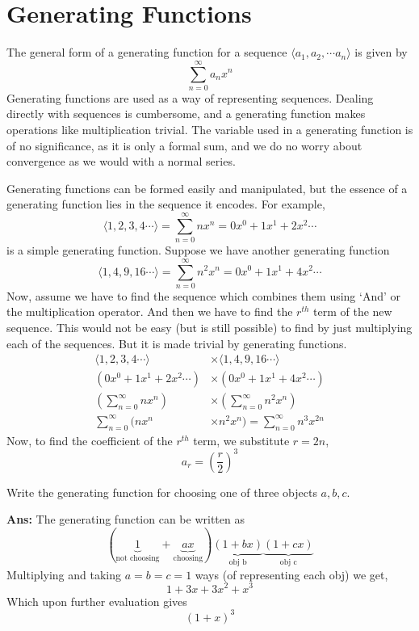 \chapter{Generating Functions}
The general form of a generating function for a sequence \mbox{$\langle a_1, a_2, \cdots a_n\rangle$} is given by
\[
    \sum_{n=0}^{\infty}a_n x^n
\]
Generating functions are used as a way of representing sequences. Dealing directly with sequences is cumbersome, and a generating function makes operations like multiplication trivial. The variable used in a generating function is of no significance, as it is only a formal sum, and we do no worry about convergence as we would with a normal series.

Generating functions can be formed easily and manipulated, but the essence of a generating function lies in the sequence it encodes. For example,
\[
    \langle1,2,3,4\cdots\rangle = \sum_{n=0}^{\infty} nx^n = 0x^0 + 1x^1 + 2x^2 \cdots
\]
is a simple generating function. Suppose we have another generating function
\[
    \langle1,4,9,16 \cdots\rangle =  \sum_{n=0}^{\infty} n^2x^n = 0x^0 + 1x^1 + 4x^2 \cdots
\]
Now, assume we have to find the sequence which combines them using `And' or the multiplication operator. And then we have to find the \mbox{$r^{th}$} term of the new sequence. This would not be easy (but is still possible) to find by just multiplying each of the sequences. But it is made trivial by generating functions.
\begin{align*}
    \langle1,2,3,4\cdots\rangle & \times \langle1,4,9,16 \cdots\rangle  \\
    (0x^0 + 1x^1 + 2x^2 \cdots) & \times (0x^0 + 1x^1 + 4x^2 \cdots)    \\
    (\sum_{n=0}^{\infty} nx^n)  & \times (\sum_{n=0}^{\infty} n^2x^n)\, \\
    \sum_{n=0}^{\infty} (nx^n   & \times n^2 x^n)
    = \sum_{n=0}^{\infty} n^3 x^{2n}
\end{align*}
Now, to find the coefficient of the \mbox{$r^{th}$} term, we substitute \mbox{$r = 2n$},
\[
    a_r = {\left(\frac{r}{2}\right)}^3
\]

\begin{example}
    Write the generating function for choosing one of three objects \mbox{$a,b,c$}.

    \textbf{Ans:} The generating function can be written as
    \[
        (\underbrace{1}_{\text{not choosing}}+\underbrace{ax}_{\text{choosing}})\underbrace{(1+bx)}_{\text{obj b}}\underbrace{(1+cx)}_{\text{obj c}}
    \]
    Multiplying and taking \mbox{$a=b=c=1$} ways (of representing each obj) we get,
    \[
        1+3x+3x^2+x^3
    \]
    Which upon further evaluation gives
    \[
        {(1+x)}^3
    \]
\end{example}

